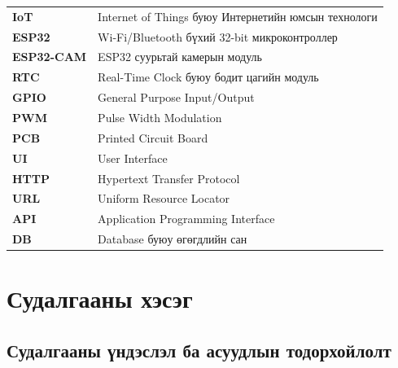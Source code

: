\documentclass[12pt,a4paper]{report}
\begin{document}
\begin{center}
  \begin{tabular}{ll}
    \textbf{IoT}      & Internet of Things буюу Интернетийн юмсын технологи \\[4pt]
    \textbf{ESP32}    & Wi-Fi/Bluetooth бүхий 32-bit микроконтроллер \\[4pt]
    \textbf{ESP32-CAM}& ESP32 суурьтай камерын модуль \\[4pt]
    \textbf{RTC}      & Real-Time Clock буюу бодит цагийн модуль \\[4pt]
    \textbf{GPIO}     & General Purpose Input/Output \\[4pt]
    \textbf{PWM}      & Pulse Width Modulation \\[4pt]
    \textbf{PCB}      & Printed Circuit Board \\[4pt]
    \textbf{UI}       & User Interface \\[4pt]
    \textbf{HTTP}     & Hypertext Transfer Protocol \\[4pt]
    \textbf{URL}      & Uniform Resource Locator \\[4pt]
    \textbf{API}      & Application Programming Interface \\[4pt]
    \textbf{DB}       & Database буюу өгөгдлийн сан \\
  \end{tabular}
\end{center}

\newpage
\tableofcontents
\cleardoublepage
\listoffigures
\cleardoublepage
\listoftables

\cleardoublepage
{}
\setcounter{page}{1}
\pagestyle{fancy}

\chapter{Судалгааны хэсэг}

\section{Судалгааны үндэслэл ба асуудлын тодорхойлолт}
\end{document}
